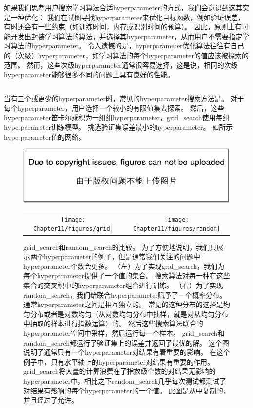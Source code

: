 如果我们思考用户搜索学习算法合适\gls{hyperparameter}的方式，我们会意识到这其实是一种优化：
我们在试图寻找\gls{hyperparameter}来优化目标函数，例如验证误差，有时还会有一些约束（如训练时间，内存或识别时间的预算）。
因此，原则上有可能开发出封装学习算法的算法，并选择其\gls{hyperparameter}，从而用户不需要指定学习算法的\gls{hyperparameter}。
令人遗憾的是，\gls{hyperparameter}优化算法往往有自己的（次级）\gls{hyperparameter}，如学习算法的每个\gls{hyperparameter}的值应该被探索的范围。
然而，这些次级\gls{hyperparameter}通常很容易选择，这是说，相同的次级\gls{hyperparameter}能够很多不同的问题上具有良好的性能。

\subsection{}
\label{sec:grid_search}
当有三个或更少的\gls{hyperparameter}时，常见的\gls{hyperparameter}搜索方法是。
对于每个\gls{hyperparameter}，用户选择一个较小的有限值集去探索。
然后，这些\gls{hyperparameter}笛卡尔乘积为一组组\gls{hyperparameter}，\gls{grid_search}使用每组\gls{hyperparameter}训练模型。
挑选验证集误差最小的\gls{hyperparameter}。
如所示\gls{hyperparameter}值的网络。


\begin{figure}[!htb]
\ifOpenSource
\centerline{\includegraphics{figure.pdf}}
\else
\begin{tabular}{cc}
\texttt{[image: Chapter11/figures/grid]} &
\texttt{[image: Chapter11/figures/random]}
\end{tabular}
\fi
\caption{\gls{grid_search}和\gls{random_search}的比较。
为了方便地说明，我们只展示两个\gls{hyperparameter}的例子，但是通常我们关注的问题中\gls{hyperparameter}个数会更多。
（左）为了实现\gls{grid_search}，我们为每个\gls{hyperparameter}提供了一个值的集合。
搜索算法对每一种在这些集合的交叉积中的\gls{hyperparameter}组合进行训练。
（右）为了实现\gls{random_search}，我们给联合\gls{hyperparameter}赋予了一个概率分布。
通常\gls{hyperparameter}之间是相互独立的。
常见的这种分布的选择是均匀分布或者是对数均匀（从对数均匀分布中抽样，就是对从均匀分布中抽取的样本进行指数运算）的。
然后这些搜索算法联合的\gls{hyperparameter}空间中采样，然后运行每一个样本。
\gls{grid_search}和\gls{random_search}都运行了验证集上的误差并返回了最优的解。
这个图说明了通常只有一个\gls{hyperparameter}对结果有着重要的影响。
在这个例子中，只有水平轴上的\gls{hyperparameter}对结果有重要的作用。
\gls{grid_search}将大量的计算浪费在了指数级个数的对结果无影响的\gls{hyperparameter}中，相比之下\gls{random_search}几乎每次测试都测试了对结果有影响的每个\gls{hyperparameter}的一个值。
此图是从\citet{Bergstra+Bengio-LW2011}中复制的，并且经过了允许。}
\label{fig:chap11_grid_vs_random}
\end{figure}

